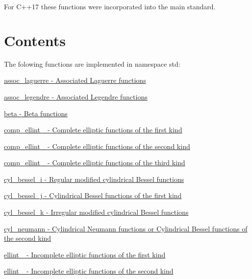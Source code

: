 For C++17 these functions were incorporated into the main standard.\hypertarget{index_contents}{}\section{Contents}\label{index_contents}
The folowing functions are implemented in namespace {\ttfamily std\+:} 
\begin{DoxyItemize}
\item \hyperlink{group__tr29124__math__spec__func_ga377bb7e038c464a27dfe0573fd2d7b33}{assoc\+\_\+laguerre -\/ Associated Laguerre functions}
\item \hyperlink{group__tr29124__math__spec__func_ga355349f79119c1fd1e2a9351cec57f0f}{assoc\+\_\+legendre -\/ Associated Legendre functions}
\item \hyperlink{group__tr29124__math__spec__func_ga6a7220c87c942db48b18b527d92bbd2d}{beta -\/ Beta functions}
\item \hyperlink{group__tr29124__math__spec__func_gac559500c604c43ea943d593c9ad9d289}{comp\+\_\+ellint\+\_ -\/ Complete elliptic functions of the first kind}
\item \hyperlink{group__tr29124__math__spec__func_ga22fcc678829f0daf2de257896378e7e0}{comp\+\_\+ellint\+\_ -\/ Complete elliptic functions of the second kind}
\item \hyperlink{group__tr29124__math__spec__func_gad833404645e24b7f0598a640ff92d623}{comp\+\_\+ellint\+\_ -\/ Complete elliptic functions of the third kind}
\item \hyperlink{group__tr29124__math__spec__func_ga1c9b5a5c36f000a4f0a55f7fcc486cb0}{cyl\+\_\+bessel\+\_\+i -\/ Regular modified cylindrical Bessel functions}
\item \hyperlink{group__tr29124__math__spec__func_ga47e21a13b6d68d0d7f057699bd3b3ce0}{cyl\+\_\+bessel\+\_\+j -\/ Cylindrical Bessel functions of the first kind}
\item \hyperlink{group__tr29124__math__spec__func_ga76dcd3884620955680112aca0d327ada}{cyl\+\_\+bessel\+\_\+k -\/ Irregular modified cylindrical Bessel functions}
\item \hyperlink{group__tr29124__math__spec__func_ga5b7c72ab85e361cbd73f1a3b5f0725a6}{cyl\+\_\+neumann -\/ Cylindrical Neumann functions or Cylindrical Bessel functions of the second kind}
\item \hyperlink{group__tr29124__math__spec__func_gae6b3df5556f38a7d72f9b4457d856f9c}{ellint\+\_ -\/ Incomplete elliptic functions of the first kind}
\item \hyperlink{group__tr29124__math__spec__func_gad6dd71db2b3f90d24ff49bf8cf37bc37}{ellint\+\_ -\/ Incomplete elliptic functions of the second kind}

\end{DoxyItemize}

